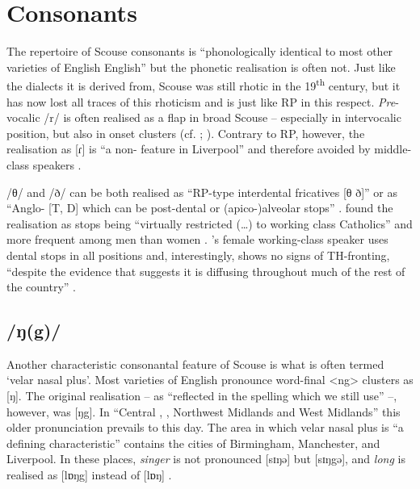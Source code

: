 	\section{Consonants}\label{sec.var.con}

The repertoire of Scouse consonants is ``phonologically identical to most other varieties of English English'' \citep[351]{watson2007} but the phonetic realisation is often not.
Just like the  dialects it is derived from, Scouse was still rhotic in the 19\textsuperscript{th} century, but it has now lost all traces of this rhoticism \citep[cf.][149]{knowles1997} and is just like RP in this respect.
\emph{Pre}-vocalic /r/ is often realised as a flap in broad Scouse -- especially in intervocalic position, but also in onset clusters (cf. \citealt[107 and 329--330]{knowles1973}; \citealt[352]{watson2007}).
Contrary to RP, however, the realisation as [ɾ] is ``a non- feature in Liverpool'' and therefore avoided by middle-class speakers \citep[329]{knowles1973}.

/θ/ and /ð/ can be both realised as ``RP-type interdental fricatives [θ ð]'' or as ``Anglo- [T, D] which can be post-dental or (apico-)alveolar stops'' \citep[323]{knowles1973}.
\citeauthor{knowles1973} found the realisation as stops being ``virtually restricted (\ldots) to working class Catholics'' and more frequent among men than women \citep[323--324]{knowles1973}.
\cite{watson2007}'s female working-class speaker uses dental stops in all positions and, interestingly, shows no signs of TH-fronting, ``despite the evidence that suggests it is diffusing throughout much of the rest of the country'' \parencite[cf.][352]{watson2007}.

		\subsection{/ŋ(g)/}\label{sec.var.con.ng}

Another characteristic consonantal feature of Scouse is what is often termed `velar nasal plus'.
Most varieties of English pronounce word-final <ng> clusters as [ŋ].
The original realisation -- as ``reflected in the spelling which we still use'' \citep[58]{trudgill1999} --, however, was [ŋg]. In ``Central , , Northwest Midlands and West Midlands'' \citep[58]{trudgill1999} this older pronunciation prevails to this day. 
The area in which velar nasal plus is ``a defining characteristic'' \citep[58]{trudgill1999} contains the cities of Birmingham, Manchester, and Liverpool.
In these places, \emph{singer} is not pronounced [sɪŋə] but [sɪŋgə], and \emph{long} is realised as [lɒŋg] instead of [lɒŋ] \citep[cf.][58]{trudgill1999}.

